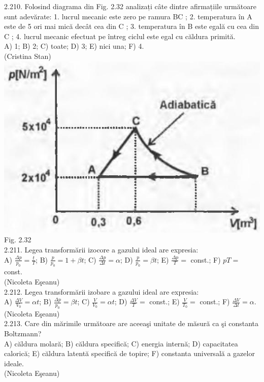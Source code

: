\documentclass[10pt]{article}
\begin{document}
2.210. Folosind diagrama din Fig. 2.32 analizați câte dintre afirmațiile următoare sunt adevărate: 1. lucrul mecanic este zero pe ramura BC ; 2. temperatura în A este de 5 ori mai mică decât cea din C ; 3. temperatura în B este egală cu cea din C ; 4. lucrul mecanic efectuat pe întreg ciclul este egal cu căldura primită.\\ A) 1; B) 2; C) toate; D) 3; E) nici una; F) 4.\\ (Cristina Stan)\\ \includegraphics[max width=\textwidth, center]{2025_07_01_5b3ff9fa0d508c8e9f17g-121(1)} Fig. 2.32\\

2.211. Legea transformării izocore a gazului ideal are expresia:\\ A) $\frac{\Delta p}{p_{0}}=\frac{t}{T}$; B) $\frac{p}{p_{0}}=1+\beta t$; C) $\frac{\Delta p}{\Delta t}=\alpha$; D) $\frac{p}{p_{0}}=\beta t$; E) $\frac{\Delta p}{T}=$ const.; F) $p T=$ const.\\ (Nicoleta Eşeanu)\\

2.212. Legea transformării izobare a gazului ideal are expresia:\\ A) $\frac{\Delta V}{V_{0}}=\alpha t$; B) $\frac{\Delta p}{p_{0}}=\beta t$; C) $\frac{V}{V_{0}}=\alpha t$; D) $\frac{\Delta V}{T}=$ const.; E) $\frac{V}{T_{0}}=$ const.; F) $\frac{\Delta V}{\Delta t}=\alpha$.\\ (Nicoleta Eşeanu)\\

2.213. Care din mărimile următoare are aceeaşi unitate de măsură ca şi constanta Boltzmann?\\ A) căldura molară; B) căldura specifică; C) energia internă; D) capacitatea calorică; E) căldura latentă specifică de topire; F) constanta universală a gazelor ideale.\\ (Nicoleta Eşeanu)\\
\end{document}
